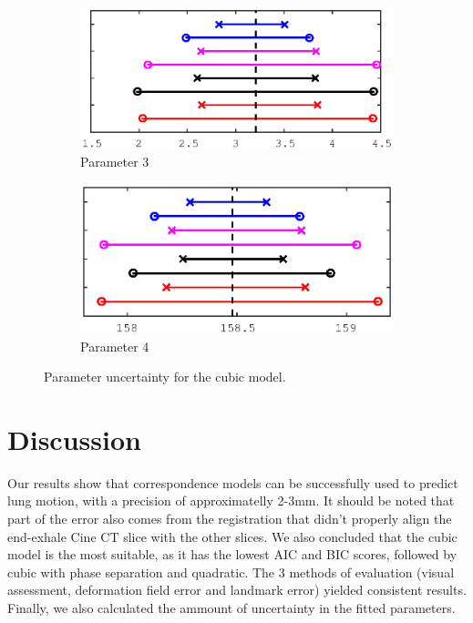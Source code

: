 \documentclass[11pt,a4paper,oneside]{report}
\begin{document}
\begin{figure}
  \begin{subfigure}[b]{0.5\textwidth}
    \includegraphics[width=\textwidth, trim=0 0 0 0,clip=true]{figures/task5/uncert_model3_param3.eps}
    \caption{Parameter 3}
  \end{subfigure}%
  \begin{subfigure}[b]{0.5\textwidth}
    \includegraphics[width=\textwidth, trim=0 0 0 0,clip=true]{figures/task5/uncert_model3_param4.eps}
    \caption{Parameter 4}
  \end{subfigure}%
  
  \caption{Parameter uncertainty for the cubic model.}
  \label{fig:c5uncertM3}
  
\end{figure}

\section*{Discussion}
Our results show that correspondence models can be successfully used to predict lung motion, with a precision of approximatelly 2-3mm. It should be noted that part of the error also comes from the registration that didn't properly align the end-exhale Cine CT slice with the other slices. We also concluded that the cubic model is the most suitable, as it has the lowest AIC and BIC scores, followed by cubic with phase separation and quadratic. The 3 methods of evaluation (visual assessment, deformation field error and landmark error) yielded consistent results. Finally, we also calculated the ammount of uncertainty in the fitted parameters. 
\end{document}
